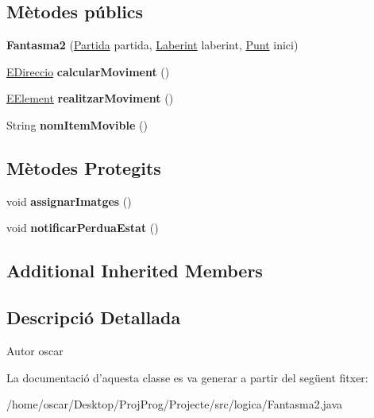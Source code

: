 \subsection*{Mètodes públics}
\begin{DoxyCompactItemize}
\item 
\hypertarget{classlogica_1_1_fantasma2_a0c387e2b93f51714ae84d162fdf05ef0}{{\bfseries Fantasma2} (\hyperlink{classlogica_1_1_partida}{Partida} partida, \hyperlink{classlogica_1_1laberints_1_1_laberint}{Laberint} laberint, \hyperlink{classlogica_1_1_punt}{Punt} inici)}\label{classlogica_1_1_fantasma2_a0c387e2b93f51714ae84d162fdf05ef0}

\item 
\hypertarget{classlogica_1_1_fantasma2_a0ea5a98c11778bc3b09f66ea5c7a1db1}{\hyperlink{enumlogica_1_1enumeracions_1_1_e_direccio}{E\+Direccio} {\bfseries calcular\+Moviment} ()}\label{classlogica_1_1_fantasma2_a0ea5a98c11778bc3b09f66ea5c7a1db1}

\item 
\hypertarget{classlogica_1_1_fantasma2_a926e994ae93170f8c044195ac8f21373}{\hyperlink{enumlogica_1_1enumeracions_1_1_e_element}{E\+Element} {\bfseries realitzar\+Moviment} ()}\label{classlogica_1_1_fantasma2_a926e994ae93170f8c044195ac8f21373}

\item 
\hypertarget{classlogica_1_1_fantasma2_a07a2087fbf3959176a4d4b9b81caf660}{String {\bfseries nom\+Item\+Movible} ()}\label{classlogica_1_1_fantasma2_a07a2087fbf3959176a4d4b9b81caf660}

\end{DoxyCompactItemize}
\subsection*{Mètodes Protegits}
\begin{DoxyCompactItemize}
\item 
\hypertarget{classlogica_1_1_fantasma2_a5ba4c0f99f09122c393203c474fe5562}{void {\bfseries assignar\+Imatges} ()}\label{classlogica_1_1_fantasma2_a5ba4c0f99f09122c393203c474fe5562}

\item 
\hypertarget{classlogica_1_1_fantasma2_a7a334328a30cc606d6b995904fffb3c7}{void {\bfseries notificar\+Perdua\+Estat} ()}\label{classlogica_1_1_fantasma2_a7a334328a30cc606d6b995904fffb3c7}

\end{DoxyCompactItemize}
\subsection*{Additional Inherited Members}


\subsection{Descripció Detallada}
\begin{DoxyAuthor}{Autor}
oscar 
\end{DoxyAuthor}


La documentació d'aquesta classe es va generar a partir del següent fitxer\+:\begin{DoxyCompactItemize}
\item 
/home/oscar/\+Desktop/\+Proj\+Prog/\+Projecte/src/logica/Fantasma2.\+java\end{DoxyCompactItemize}
